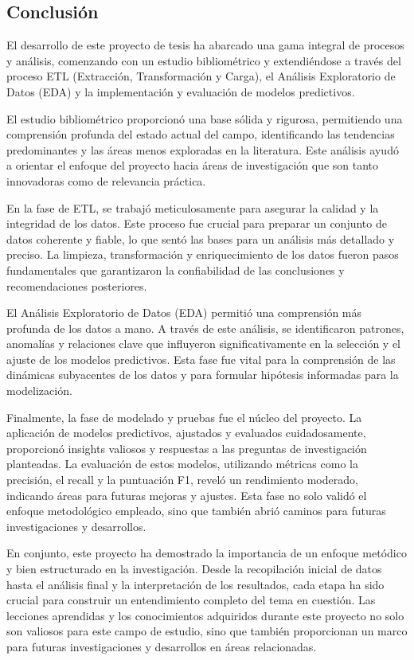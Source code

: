\subsection{Conclusión}

El desarrollo de este proyecto de tesis ha abarcado una gama integral de procesos y análisis, comenzando con un estudio bibliométrico y extendiéndose a través del proceso ETL (Extracción, Transformación y Carga), el Análisis Exploratorio de Datos (EDA) y la implementación y evaluación de modelos predictivos.

El estudio bibliométrico proporcionó una base sólida y rigurosa, permitiendo una comprensión profunda del estado actual del campo, identificando las tendencias predominantes y las áreas menos exploradas en la literatura. Este análisis ayudó a orientar el enfoque del proyecto hacia áreas de investigación que son tanto innovadoras como de relevancia práctica.

En la fase de ETL, se trabajó meticulosamente para asegurar la calidad y la integridad de los datos. Este proceso fue crucial para preparar un conjunto de datos coherente y fiable, lo que sentó las bases para un análisis más detallado y preciso. La limpieza, transformación y enriquecimiento de los datos fueron pasos fundamentales que garantizaron la confiabilidad de las conclusiones y recomendaciones posteriores.

El Análisis Exploratorio de Datos (EDA) permitió una comprensión más profunda de los datos a mano. A través de este análisis, se identificaron patrones, anomalías y relaciones clave que influyeron significativamente en la selección y el ajuste de los modelos predictivos. Esta fase fue vital para la comprensión de las dinámicas subyacentes de los datos y para formular hipótesis informadas para la modelización.

Finalmente, la fase de modelado y pruebas fue el núcleo del proyecto. La aplicación de modelos predictivos, ajustados y evaluados cuidadosamente, proporcionó insights valiosos y respuestas a las preguntas de investigación planteadas. La evaluación de estos modelos, utilizando métricas como la precisión, el recall y la puntuación F1, reveló un rendimiento moderado, indicando áreas para futuras mejoras y ajustes. Esta fase no solo validó el enfoque metodológico empleado, sino que también abrió caminos para futuras investigaciones y desarrollos.

En conjunto, este proyecto ha demostrado la importancia de un enfoque metódico y bien estructurado en la investigación. Desde la recopilación inicial de datos hasta el análisis final y la interpretación de los resultados, cada etapa ha sido crucial para construir un entendimiento completo del tema en cuestión. Las lecciones aprendidas y los conocimientos adquiridos durante este proyecto no solo son valiosos para este campo de estudio, sino que también proporcionan un marco para futuras investigaciones y desarrollos en áreas relacionadas.


